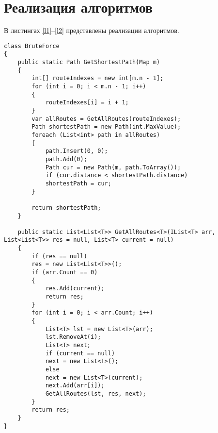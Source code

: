 \section{Реализация алгоритмов}
В листингах \ref{l1}--\ref{l2} представлены реализации алгоритмов. 
\begin{center}
\begin{lstlisting}[label=l1, caption={Реализация алгоритма полного перебора}]
 class BruteForce
{
	public static Path GetShortestPath(Map m)
	{
		int[] routeIndexes = new int[m.n - 1];
		for (int i = 0; i < m.n - 1; i++)
		{
			routeIndexes[i] = i + 1;
		}
		var allRoutes = GetAllRoutes(routeIndexes); 
		Path shortestPath = new Path(int.MaxValue);
		foreach (List<int> path in allRoutes)
		{
			path.Insert(0, 0);
			path.Add(0);
			Path cur = new Path(m, path.ToArray());
			if (cur.distance < shortestPath.distance)
			shortestPath = cur;
		}
		
		return shortestPath;
	}
	
	public static List<List<T>> GetAllRoutes<T>(IList<T> arr, List<List<T>> res = null, List<T> current = null)
	{
		if (res == null)
		res = new List<List<T>>();
		if (arr.Count == 0) 
		{
			res.Add(current);
			return res;
		}
		for (int i = 0; i < arr.Count; i++)
		{
			List<T> lst = new List<T>(arr);
			lst.RemoveAt(i);
			List<T> next;
			if (current == null)
			next = new List<T>();
			else
			next = new List<T>(current);
			next.Add(arr[i]);
			GetAllRoutes(lst, res, next);
		}
		return res;
	}
}
\end{lstlisting}
\end{center}
